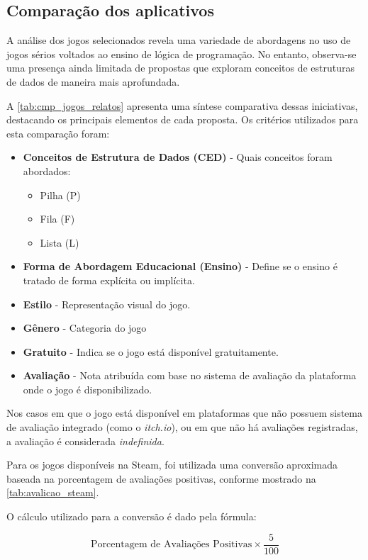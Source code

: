 \subsection{Comparação dos aplicativos}

A análise dos jogos selecionados revela uma variedade de abordagens no uso de
jogos sérios voltados ao ensino de lógica de programação. No entanto,
observa-se uma presença ainda limitada de propostas que exploram conceitos de
estruturas de dados de maneira mais aprofundada.

A \autoref{tab:cmp_jogos_relatos} apresenta uma síntese comparativa dessas
iniciativas, destacando os principais elementos de cada proposta. Os critérios
utilizados para esta comparação foram:

\begin{itemize}
  \item \textbf{Conceitos de Estrutura de Dados (CED)} - Quais conceitos foram abordados:
  \begin{itemize}
    \item Pilha (P)
    \item Fila (F)
    \item Lista (L)
  \end{itemize}
  \item \textbf{Forma de Abordagem Educacional (Ensino)} - Define se o ensino é tratado de forma explícita ou implícita.
  \item \textbf{Estilo} - Representação visual do jogo.
  \item \textbf{Gênero} - Categoria do jogo
  \item \textbf{Gratuito} - Indica se o jogo está disponível gratuitamente.
  \item \textbf{Avaliação} - Nota atribuída com base no sistema de avaliação da plataforma onde o jogo é disponibilizado.
\end{itemize}

Nos casos em que o jogo está disponível em plataformas que não possuem sistema
de avaliação integrado (como o \emph{itch.io}), ou em que não há avaliações
registradas, a avaliação é considerada \emph{indefinida}.

Para os jogos disponíveis na Steam, foi utilizada uma conversão aproximada
baseada na porcentagem de avaliações positivas, conforme mostrado na
\autoref{tab:avalicao_steam}.





O cálculo utilizado para a conversão é dado pela fórmula:

\[
  \text{Porcentagem de Avaliações Positivas} \times \frac{5}{100}
\]
